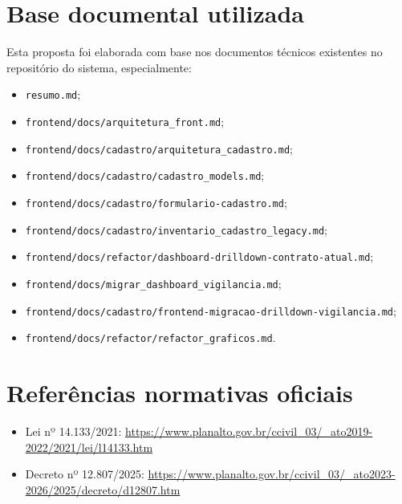 \documentclass[12pt,a4paper]{article}
\begin{document}
\section*{Base documental utilizada}

Esta proposta foi elaborada com base nos documentos técnicos existentes no repositório do sistema, especialmente:

\begin{itemize}[leftmargin=1.5cm]
\item \texttt{resumo.md};
\item \texttt{frontend/docs/arquitetura\_front.md};
\item \texttt{frontend/docs/cadastro/arquitetura\_cadastro.md};
\item \texttt{frontend/docs/cadastro/cadastro\_models.md};
\item \texttt{frontend/docs/cadastro/formulario-cadastro.md};
\item \texttt{frontend/docs/cadastro/inventario\_cadastro\_legacy.md};
\item \texttt{frontend/docs/refactor/dashboard-drilldown-contrato-atual.md};
\item \texttt{frontend/docs/migrar\_dashboard\_vigilancia.md};
\item \texttt{frontend/docs/cadastro/frontend-migracao-drilldown-vigilancia.md};
\item \texttt{frontend/docs/refactor/refactor\_graficos.md}.
\end{itemize}

\section*{Referências normativas oficiais}

\begin{itemize}[leftmargin=1.5cm]
\item Lei nº 14.133/2021: \url{https://www.planalto.gov.br/ccivil_03/_ato2019-2022/2021/lei/l14133.htm}
\item Decreto nº 12.807/2025: \url{https://www.planalto.gov.br/ccivil_03/_ato2023-2026/2025/decreto/d12807.htm}
\end{itemize}
\end{document}
